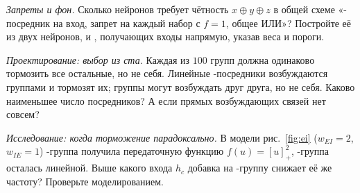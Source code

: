 \begin{exercise}[\lvlB]
\label{ex:03:6}
\emph{Запреты и фон.} Сколько нейронов требует чётность $x\oplus y\oplus z$ в общей схеме «-посредник на вход, запрет на каждый набор с $f=1$, общее ИЛИ»? Постройте её из двух нейронов,  и , получающих входы напрямую, указав веса и пороги.
\end{exercise}

\begin{exercise}[\lvlC]
\label{ex:03:7}
\emph{Проектирование: выбор из ста.} Каждая из $100$ групп  должна одинаково тормозить все остальные, но не себя. Линейные -посредники возбуждаются группами и тормозят их; группы могут возбуждать друг друга, но не себя. Каково наименьшее число посредников? А если прямых возбуждающих связей нет совсем?
\end{exercise}

\begin{exercise}[\lvlC]
\label{ex:03:8}
\emph{Исследование: когда торможение парадоксально.} В модели рис.~\ref{fig:ei} ($w_{EI}=2$, $w_{IE}=1$) -группа получила передаточную функцию $f(u)=[u]_+^2$, -группа осталась линейной. Выше какого входа $h_c$ добавка на -группу снижает её же частоту? Проверьте моделированием.
\end{exercise}
